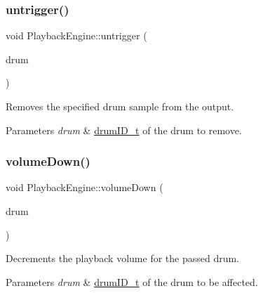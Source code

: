\subsubsection{\texorpdfstring{untrigger()}{untrigger()}}
{\footnotesize\ttfamily void Playback\+Engine\+::untrigger (\begin{DoxyParamCaption}\item[{\hyperlink{namespacedrumpi_a3897274035c1b939a604438abe648b1b}{drum\+I\+D\+\_\+t}}]{drum }\end{DoxyParamCaption})}

Removes the specified drum sample from the output. 
\begin{DoxyParams}{Parameters}
{\em drum} & \hyperlink{namespacedrumpi_a3897274035c1b939a604438abe648b1b}{drum\+I\+D\+\_\+t} of the drum to remove. \\
\hline
\end{DoxyParams}
\mbox{\label{classdrumpi_1_1audio_1_1PlaybackEngine_aaef941772efa599c4782991676670145}} 
\subsubsection{\texorpdfstring{volume\+Down()}{volumeDown()}\hspace{0.1cm}{\footnotesize\ttfamily [1/2]}}
{\footnotesize\ttfamily void Playback\+Engine\+::volume\+Down (\begin{DoxyParamCaption}\item[{\hyperlink{namespacedrumpi_a3897274035c1b939a604438abe648b1b}{drum\+I\+D\+\_\+t}}]{drum }\end{DoxyParamCaption})}

Decrements the playback volume for the passed drum. 
\begin{DoxyParams}{Parameters}
{\em drum} & \hyperlink{namespacedrumpi_a3897274035c1b939a604438abe648b1b}{drum\+I\+D\+\_\+t} of the drum to be affected. \\
\hline
\end{DoxyParams}
\mbox{\label{classdrumpi_1_1audio_1_1PlaybackEngine_ac11e4716ab1873f636ade9f762857427}} 

